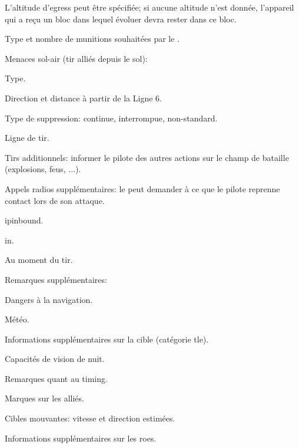 \begin{e1}
{		L'altitude d'egress peut être spécifiée; si aucune altitude n'est donnée, l'appareil qui a reçu \ja{} un bloc dans lequel évoluer devra rester dans ce bloc.
	}
	
	
	\begin{e2}
		
		
		\begin{e3}
			
			\item Type et nombre de munitions souhaitées par le \ja{}.
			
			\item Menaces sol-air (tir alliés depuis le sol):
			
			\begin{e4}
				
				\item Type.
				\item Direction et distance à partir de la Ligne 6.
				\item Type de suppression: continue, interrompue, non-standard.
				\item Ligne de tir.
				
			\end{e4}
			
			\item Tirs additionnels: informer le pilote des autres actions sur le champ de bataille (explosions, feus, ...).
			
			\item Appels radios supplémentaires: le \ja{} peut demander à ce que le pilote reprenne contact lors de son attaque.
			
			\begin{e4}
				
				\item \gls{ipinbound}.
				\item \gls{in}.
				\item Au moment du tir.
				
			\end{e4}
			
			\item Remarques supplémentaires:
			
			\begin{e4}
				
				\item Dangers à la navigation.
				\item Météo.
				\item Informations supplémentaires sur la cible (catégorie \gls{tle}).
				\item Capacités de vision de nuit.
				\item Remarques quant au timing.
				\item Marques sur les alliés.
				\item Cibles mouvantes: vitesse et direction estimées.
				\item Informations supplémentaires sur les \glspl{roe}.
				

\end{e4}
\end{e3}
\end{e2}
\end{e1}
